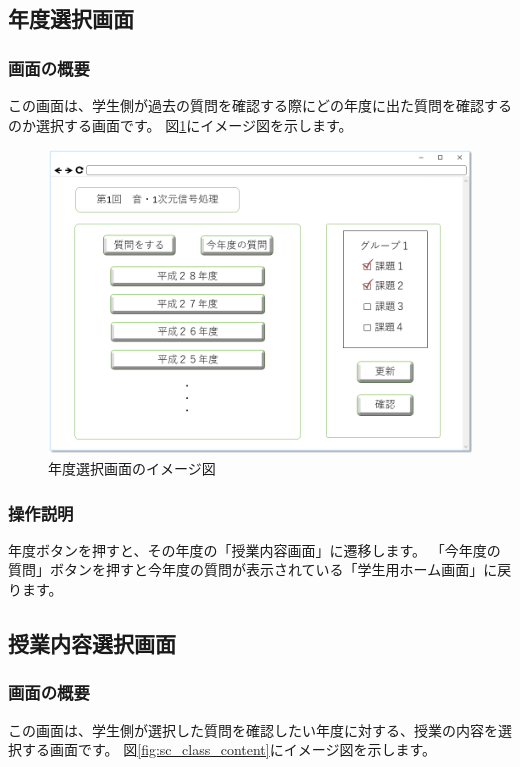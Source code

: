 \subsection{年度選択画面}
\subsubsection{画面の概要}
この画面は、学生側が過去の質問を確認する際にどの年度に出た質問を確認するのか選択する画面です。
図\ref{fig:sc_select_year}にイメージ図を示します。

\begin{figure}[htbp]
\begin{center}
  \includegraphics[width=1\linewidth,clip]{./img/sc_select_year.png}
  \caption{年度選択画面のイメージ図}\label{fig:sc_select_year}
\end{center}
\end{figure}

\subsubsection{操作説明}
年度ボタンを押すと、その年度の「授業内容画面」に遷移します。
「今年度の質問」ボタンを押すと今年度の質問が表示されている「学生用ホーム画面」に戻ります。

\subsection{授業内容選択画面}
\subsubsection{画面の概要}
この画面は、学生側が選択した質問を確認したい年度に対する、授業の内容を選択する画面です。
図\ref{fig:sc_class_content}にイメージ図を示します。

